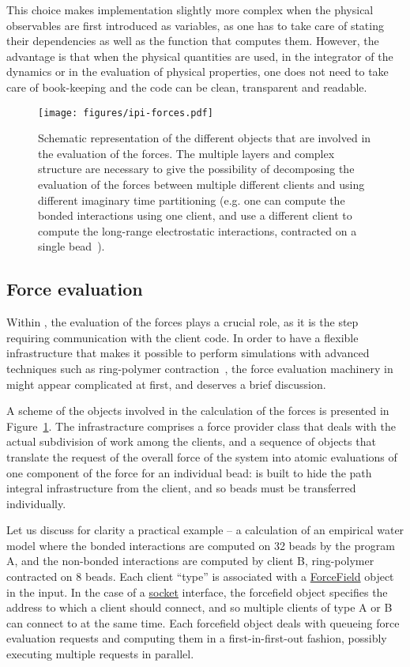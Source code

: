 \documentclass[11pt,english,fleqn]{report}
\begin{document}
This choice makes implementation slightly more complex when the physical
observables are first introduced as variables, as one has to take
care of stating their dependencies as well as the function that computes
them. However, the advantage is that when the physical quantities
are used, in the integrator of the dynamics or in the evaluation of
physical properties, one does not need to take care of book-keeping
and the code can be clean, transparent and readable.


\begin{figure}[hpbt]
\centering\texttt{[image: figures/ipi-forces.pdf]}
\caption{\label{fig:forces} Schematic representation of the different objects
that are involved in the evaluation of the forces. The multiple layers and complex
structure are necessary to give the possibility of decomposing the evaluation 
of the forces between multiple different clients and using different imaginary
time partitioning (e.g. one can compute the bonded interactions using one client,
and use a different client to compute the long-range electrostatic interactions,
contracted on a single bead~\cite{mark-mano08jcp}). 
}
\end{figure}


\subsection{Force evaluation}

Within \ipi{}, the evaluation of the forces plays a crucial role, 
as it is the step requiring communication with the client code. 
In order to have a flexible infrastructure that makes it possible
to perform simulations with advanced techniques such as ring-polymer
contraction~\cite{mark-mano08jcp}, the force evaluation machinery
in \ipi{} might appear complicated at first, and deserves a brief
discussion.

A scheme of the objects involved in the calculation of the forces
is presented in Figure~\ref{fig:forces}. The infrastracture comprises
a force provider class that deals with the actual subdivision of 
work among the clients, and a sequence of objects that translate
the request of the overall force of the system into atomic 
evaluations of one component of the force for an individual bead:
\ipi{} is built to hide the path integral infrastructure from the client, and so 
beads must be transferred individually.

Let us discuss for clarity a practical example -- a calculation 
of an empirical water model where the bonded interactions are 
computed on 32 beads by the program A, and the non-bonded interactions
are computed by client B, ring-polymer contracted on 8 beads.
Each client ``type'' is associated with a \hyperref[FORCEFIELD]{ForceField} 
object in the input. In the case of a \hyperref[FFSOCKET]{socket} interface,
the forcefield object specifies the address to which a client should connect,
and so multiple clients of type A or B can connect to \ipi{} at the same time.
Each forcefield object deals with queueing force evaluation requests
and computing them in a first-in-first-out fashion, possibly executing 
multiple requests in parallel. 
\end{document}
